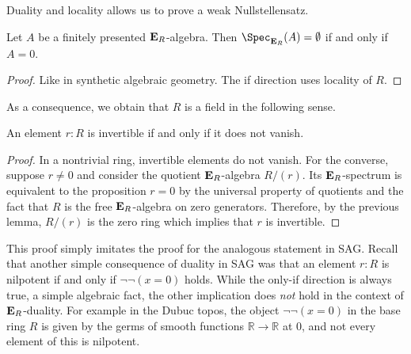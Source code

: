 {Duality and locality allows us to prove a weak Nullstellensatz.

\begin{lemma}
  Let \(A\) be a finitely presented \(\mathbf{E}_R\)-algebra.
  Then \(\Spec_{\EE_R}(A)=\emptyset\) if and only if \(A=0\).
\end{lemma}
\begin{proof}
  Like in synthetic algebraic geometry.
  The if direction uses locality of \(R\).
\end{proof}

As a consequence, we obtain that \(R\) is a field in the following sense.

\begin{lemma}
  An element \(r:R\) is invertible if and only if it does not vanish.
\end{lemma}
\begin{proof}
  In a nontrivial ring, invertible elements do not vanish.
  For the converse, suppose \(r\neq 0\) and consider the quotient \(\mathbf{E}_R\)-algebra \(R/(r)\).
  Its \(\mathbf{E}_R\)-spectrum is equivalent to the proposition \(r=0\) by the universal property of quotients and the fact that \(R\) is the free \(\mathbf{E}_R\)-algebra on zero generators.
  Therefore, by the previous lemma, \(R/(r)\) is the zero ring which implies that \(r\) is invertible.
\end{proof}

This proof simply imitates the proof for the analogous statement in SAG.
Recall that another simple consequence of duality in SAG was that an element \(r:R\) is nilpotent if and only if \(\neg\neg(x=0)\) holds.
While the only-if direction is always true, a simple algebraic fact, the other implication does \emph{not} hold in the context of \(\mathbf{E}_R\)-duality.
For example in the Dubuc topos, the object $\neg \neg (x = 0)$ in the base ring $R$ is given by the germs of smooth functions $\mathbb{R} \to \mathbb{R}$ 
at $0$, and not every element of this is nilpotent.


}
